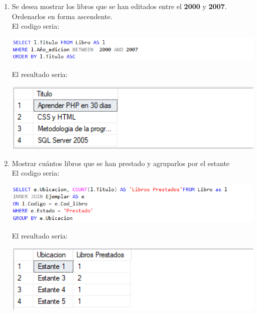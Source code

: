 \documentclass[12pt,letterpaper]{article}
\newcommand\tab[1][1cm]{\hspace*{#1}}
\begin{document}
\begin{enumerate}[\tab 1.]
\begin{center}
        \end{center}
        \item Se desea mostrar los libros que se han editados entre el \textbf{2000} y \textbf{2007}. Ordenarlos en forma ascendente.\\[0.1in]
        El codigo seria:
        \begin{center}
            \includegraphics[width=13cm]{./img/img11.1.png}
        \end{center}
        El resultado seria:
        \begin{center}
            \includegraphics[width=13cm]{./img/img11.2.png}
        \end{center}
        \item Mostrar cuántos libros que se han prestado y agruparlos por el estante\\[0.1in]
        El codigo seria:
        \begin{center}
            \includegraphics[width=13cm]{./img/img12.1.png}
        \end{center}
        El resultado seria:
        \begin{center}
            \includegraphics[width=13cm]{./img/img12.2.png}
        \end{center}
    \end{enumerate}
\end{document}
